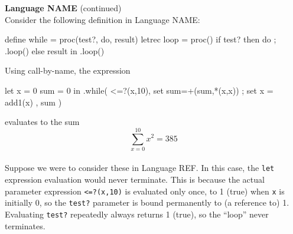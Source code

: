 \begin{minipage}[t]{\sw}
\slidenumber
\LARGE
{\bf Language NAME} (continued)\\[1.5ex]
Consider the following definition in Language NAME:
\Large
\begin{qv}
define while = proc(test?, do, result)
  letrec loop = proc()
    if test? then {do ; .loop()} else result
  in .loop()
\end{qv}
\LARGE
Using call-by-name, the expression
\Large
\begin{qv}
let x = 0 sum = 0 in
  .while(
    <=?(x,10),                                   %
    { set sum=+(sum,*(x,x)) ; set x = add1(x) }, %
    sum                                          %
  )
\end{qv}
\LARGE
evaluates to the sum
\[\sum_{x=0}^{10} x^2 = 385\]\\
Suppose we were to consider these in Language REF.
In this case, the \verb'let' expression evaluation would never terminate.
This is because the actual parameter expression \verb'<=?(x,10)'
is evaluated only once, to 1 (true) when \verb'x' is initially 0,
so the \verb'test?' parameter is bound permanently to (a reference to) 1.
Evaluating \verb'test?' repeatedly always returns 1 (true),
so the ``loop'' never terminates.
\end{minipage}
\clearpage

